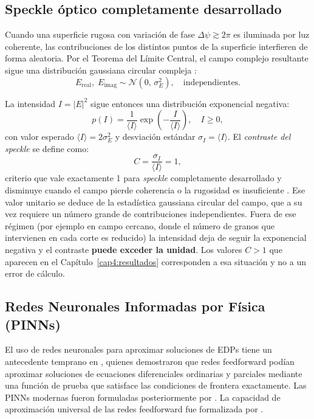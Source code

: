 \subsection{Speckle óptico completamente desarrollado}

Cuando una superficie rugosa con variación de fase $\Delta\psi \gtrsim 2\pi$ es
iluminada por luz coherente, las contribuciones de los distintos puntos de la
superficie interfieren de forma aleatoria. Por el Teorema del Límite Central,
el campo complejo resultante sigue una distribución gaussiana circular compleja
\parencite{goodman2007speckle}:
%
\begin{equation}
    E_\text{real},\; E_\text{imag} \sim \mathcal{N}(0,\, \sigma_E^2),
    \quad \text{independientes.}
    \label{eq:campo_gaussiano}
\end{equation}

La intensidad $I = |E|^2$ sigue entonces una distribución exponencial negativa:
%
\begin{equation}
    p(I) = \frac{1}{\langle I \rangle}
    \exp\!\left(-\frac{I}{\langle I \rangle}\right), \quad I \geq 0,
    \label{eq:pdf_intensidad}
\end{equation}
%
con valor esperado $\langle I \rangle = 2\sigma_E^2$ y desviación estándar
$\sigma_I = \langle I \rangle$. El \textit{contraste del speckle} se define como:
%
\begin{equation}
    C = \frac{\sigma_I}{\langle I \rangle} = 1,
    \label{eq:contraste}
\end{equation}
%
criterio que vale exactamente 1 para \textit{speckle} completamente desarrollado
y disminuye cuando el campo pierde coherencia o la rugosidad es insuficiente
\parencite{goodman2007speckle}. Ese valor unitario se deduce de la estadística
gaussiana circular del campo, que a su vez requiere un número grande de
contribuciones independientes. Fuera de ese régimen (por ejemplo en campo
cercano, donde el número de granos que intervienen en cada corte es reducido)
la intensidad deja de seguir la exponencial negativa y el contraste
\textbf{puede exceder la unidad}. Los valores $C>1$ que aparecen en el
Capítulo~\ref{cap4:resultados} corresponden a esa situación y no a un error de
cálculo.

\subsection{Redes Neuronales Informadas por Física (PINNs)}

El uso de redes neuronales para aproximar soluciones de EDPs tiene un
antecedente temprano en \textcite{lagaris1998ann}, quienes demostraron que redes
feedforward podían aproximar soluciones de ecuaciones diferenciales ordinarias
y parciales mediante una función de prueba que satisface las condiciones de
frontera exactamente. Las PINNs modernas fueron formuladas posteriormente por
\textcite{raissi2019physics}.
La capacidad de aproximación universal de las redes feedforward fue formalizada
por \textcite{hornik1989universal}.

